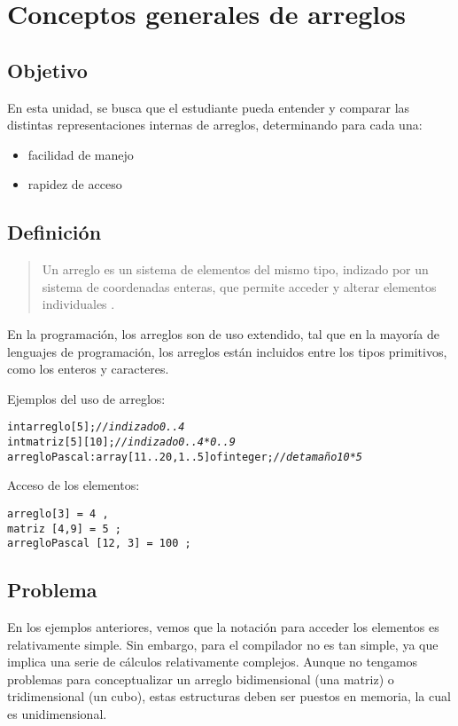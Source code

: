 \section{Conceptos generales de arreglos}
\subsection{Objetivo}
En esta unidad, se busca que el estudiante pueda entender y comparar
las distintas representaciones internas de arreglos, determinando para
cada una:
\begin{itemize}
\item facilidad de manejo
\item rapidez de acceso
\end{itemize}
    
\subsection{Definición}
\label{sec:definicion}

\begin{quote}
  Un arreglo es un sistema de elementos del mismo tipo, indizado por
  un sistema de coordenadas enteras, que permite acceder y alterar
  elementos individuales .
\end{quote}

En la programación, los arreglos son de uso extendido, tal que en la
mayoría de lenguajes de programación, los arreglos están incluidos
entre los tipos primitivos, como los enteros y caracteres.

Ejemplos del uso de arreglos:
\begin{alltt}
 int arreglo [5] ;  {\em // indizado 0..4}
 int  matriz [5][10] ;  {\em // indizado 0..4 * 0..9}
 arregloPascal:  array [11..20, 1..5] of  integer ;  {\em // de tamaño 10 * 5}
\end{alltt}

Acceso de los elementos:
\begin{verbatim}
arreglo[3] = 4 ,
matriz [4,9] = 5 ;
arregloPascal [12, 3] = 100 ;
\end{verbatim}

\subsection{Problema}
\label{sec:problema}
En los ejemplos anteriores, vemos que la notación para acceder los
elementos es relativamente simple.  Sin embargo, para el compilador no
es tan simple, ya que implica una serie de cálculos relativamente
complejos. Aunque no tengamos problemas para conceptualizar un arreglo
bidimensional (una matriz) o tridimensional (un cubo), estas
estructuras deben ser puestos en memoria, la cual es unidimensional.

